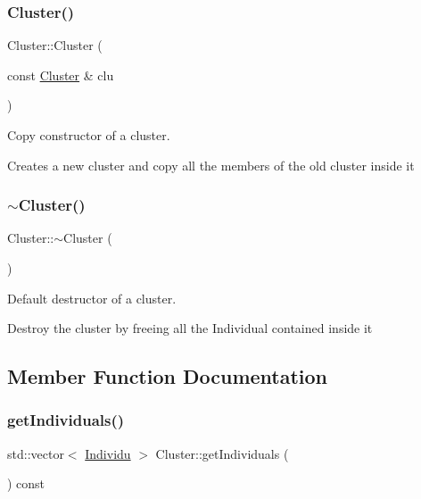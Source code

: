 \subsubsection{\texorpdfstring{Cluster()}{Cluster()}\hspace{0.1cm}{\footnotesize\ttfamily [2/2]}}
{\footnotesize\ttfamily Cluster\+::\+Cluster (\begin{DoxyParamCaption}\item[{const \hyperlink{class_cluster}{Cluster} \&}]{clu }\end{DoxyParamCaption})}



Copy constructor of a cluster. 

Creates a new cluster and copy all the members of the old cluster inside it \mbox{\label{class_cluster_a4bddfc88ac859610acab15dd12851b58}} 
\subsubsection{\texorpdfstring{$\sim$\+Cluster()}{~Cluster()}}
{\footnotesize\ttfamily Cluster\+::$\sim$\+Cluster (\begin{DoxyParamCaption}{ }\end{DoxyParamCaption})}



Default destructor of a cluster. 

Destroy the cluster by freeing all the Individual contained inside it 

\subsection{Member Function Documentation}
\mbox{\label{class_cluster_aeb50bef802b2ad60fa622184fd902644}} 
\subsubsection{\texorpdfstring{get\+Individuals()}{getIndividuals()}}
{\footnotesize\ttfamily std\+::vector$<$ \hyperlink{class_individu}{Individu} $>$ Cluster\+::get\+Individuals (\begin{DoxyParamCaption}{ }\end{DoxyParamCaption}) const}



